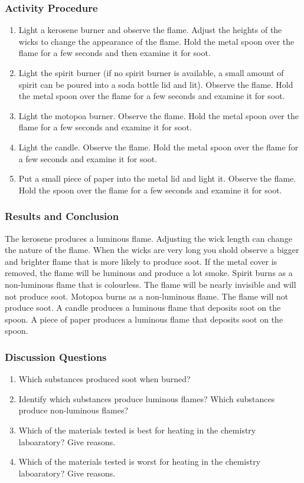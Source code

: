 \subsubsection*{Activity Procedure}
\begin{enumerate}
\item{Light a kerosene burner and observe the flame. Adjust the heights of the wicks to change the appearance of the flame. Hold the metal spoon over the flame for a few seconds and then examine it for soot.}
\item{Light the spirit burner (if no spirit burner is available, a small amount of spirit can be poured into a soda bottle lid and lit). Observe the flame. Hold the metal spoon over the flame for a few seconds and examine it for soot.}
\item{Light the motopoa burner. Observe the flame. Hold the metal spoon over the flame for a few seconds and examine it for soot.}
\item{Light the candle. Observe the flame. Hold the metal spoon over the flame for a few seconds and examine it for soot.}
\item{Put a small piece of paper into the metal lid and light it. Observe the flame. Hold the spoon over the flame for a few seconds and examine it for soot.}
\end{enumerate}

\subsubsection*{Results and Conclusion}
The kerosene produces a luminous flame. Adjusting the wick length can change the nature of the flame. When the wicks are very long you shold observe a bigger and brighter flame that is more likely to produce soot. If the metal cover is removed, the flame will be luminous and produce a lot smoke.
Spirit burns as a non-luminous flame that is colourless. The flame will be nearly invisible and will not produce soot.
Motopoa burns as a non-luminous flame. The flame will not produce soot.
A candle produces a luminous flame that deposits soot on the spoon.
A piece of paper produces a luminous flame that deposits soot on the spoon.
\subsubsection*{Discussion Questions}
\begin{enumerate}
\item{Which substances produced soot when burned?}
\item{Identify which substances produce luminous flames? Which substances produce non-luminous flames?}
\item{Which of the materials tested is best for heating in the chemistry laboaratory? Give reasons.}
\item{Which of the materials tested is worst for heating in the chemistry laboaratory? Give reasons.}
\end{enumerate}

